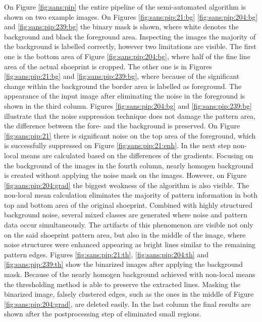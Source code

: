 \documentclass[draft,final]{vutinfth} %
\begin{document}
\par
On Figure \ref{fig:sans:pip} the entire pipeline of the semi-automated algorithm is shown on two example images.
On Figures  \ref{fig:sans:pip:21:bg} \ref{fig:sans:pip:204:bg} and \ref{fig:sans:pip:239:bg} the binary mask is shown, where white denotes the background and black the foreground area.
Inspecting the images the majority of the background is labelled correctly, however two limitations are visible.
The first one is the bottom area of Figure \ref{fig:sans:pip:204:bg}, where half of the fine line area of the actual shoeprint is cropped.
The other one is in Figures \ref{fig:sans:pip:21:bg} and \ref{fig:sans:pip:239:bg}, where because of the significant change within the background the border area is labelled as foreground.
The appearance of the input image after eliminating the noise in the foreground is shown in the third column.
Figures  \ref{fig:sans:pip:204:bg} and \ref{fig:sans:pip:239:bg} illustrate that the noise suppression technique does not damage the pattern area, the difference between the fore- and the background is preserved.
On Figure \ref{fig:sans:pip:21} there is significant noise on the top area of the foreground, which is successfully suppressed on Figure \ref{fig:sans:pip:21:enh}.
In the next step non-local means are calculated based on the differences of the gradients.
Focusing on the background of the images in the fourth column, nearly homogen background is created without applying the noise mask on the images.
However, on Figure \ref{fig:sans:pip:204:grad} the biggest weakness of the algorithm is also visible.
The non-local mean calculation eliminates the majority of pattern information in both top and bottom area of the original shoeprint.
Combined with highly structured background noise, several mixed classes are generated where noise and pattern data occur simultaneously.
The artifacts of this phenomenon are visible not only on the said shoeprint pattern area, but also in the middle of the image, where noise structures were enhanced appearing as bright lines similar to the remaining pattern edges.
Figures \ref{fig:sans:pip:21:th}, \ref{fig:sans:pip:204:th} and \ref{fig:sans:pip:239:th} show the binarized images after applying the background mask.
Because of the nearly homogen background achieved with non-local means the thresholding method is able to preserve the extracted lines.
Masking the binarized image, falsely clustered edges, such as the ones in the middle of Figure \ref{fig:sans:pip:204:grad}, are deleted easily.
In the last column the final results are shown after the postprocessing step of eliminated small regions.
\end{document}
